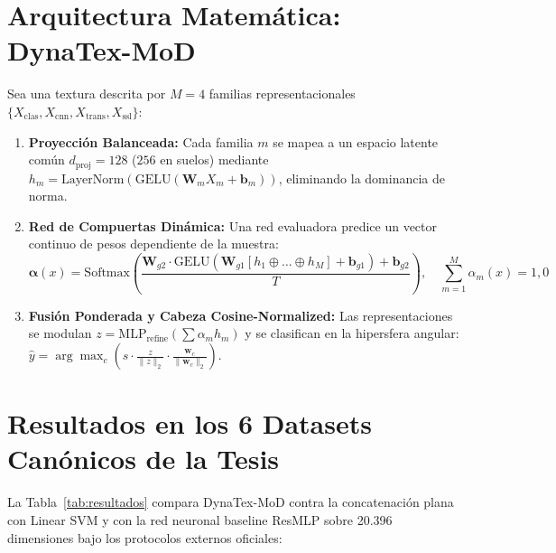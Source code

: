 \documentclass[11pt,a4paper]{article}
\begin{document}
\section{Arquitectura Matemática: DynaTex-MoD}
Sea una textura descrita por $M=4$ familias representacionales $\{X_{\text{clas}}, X_{\text{cnn}}, X_{\text{trans}}, X_{\text{ssl}}\}$:
\begin{enumerate}
    \item \textbf{Proyección Balanceada:} Cada familia $m$ se mapea a un espacio latente común $d_{\text{proj}}=128$ ($256$ en suelos) mediante $h_m = \text{LayerNorm}(\text{GELU}(\mathbf{W}_m X_m + \mathbf{b}_m))$, eliminando la dominancia de norma.
    \item \textbf{Red de Compuertas Dinámica:} Una red evaluadora predice un vector continuo de pesos dependiente de la muestra:
    $$\boldsymbol{\alpha}(x) = \text{Softmax}\left(\frac{\mathbf{W}_{g2} \cdot \text{GELU}(\mathbf{W}_{g1}[h_1 \oplus \dots \oplus h_M] + \mathbf{b}_{g1}) + \mathbf{b}_{g2}}{T}\right), \quad \sum_{m=1}^M \alpha_m(x) = 1{,}0$$
    \item \textbf{Fusión Ponderada y Cabeza Cosine-Normalized:} Las representaciones se modulan $z = \text{MLP}_{\text{refine}}(\sum \alpha_m h_m)$ y se clasifican en la hipersfera angular: $\hat{y} = \arg\max_c \left( s \cdot \frac{z}{\|z\|_2} \cdot \frac{\mathbf{w}_c}{\|\mathbf{w}_c\|_2} \right)$.
\end{enumerate}

\section{Resultados en los 6 Datasets Canónicos de la Tesis}
La Tabla~\ref{tab:resultados} compara DynaTex-MoD contra la concatenación plana con Linear SVM y con la red neuronal baseline ResMLP sobre 20.396 dimensiones bajo los protocolos externos oficiales:
\end{document}
